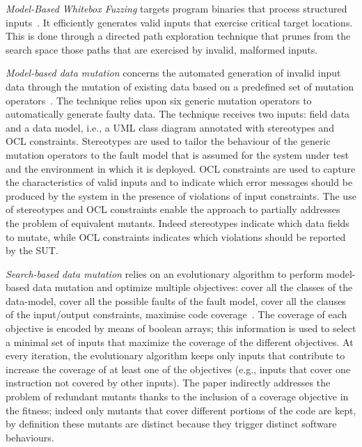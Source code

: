 \emph{Model-Based Whitebox Fuzzing} targets program binaries that process structured inputs~\cite{pham2016model}. It efficiently generates valid inputs that exercise critical target locations. This is done through a directed path exploration technique that prunes from the search space those paths that are exercised by invalid, malformed inputs.

\emph{Model-based data mutation} concerns the automated generation of invalid input data through the mutation of existing data based on a predefined set of mutation operators~\cite{di2015generating}.
The technique relies upon six generic mutation operators to automatically generate faulty data. The technique receives two inputs: field data and a data model, i.e., a UML class diagram annotated with stereotypes and OCL constraints. Stereotypes are used to tailor the behaviour of the generic mutation operators to the fault model that is assumed for the system under test and the environment in which it is deployed. 
OCL constraints are used to capture the characteristics of valid inputs and to indicate which error messages should be produced by the system in the presence of violations of input constraints.
The use of stereotypes and OCL constraints enable the approach to partially addresses the problem of equivalent mutants. Indeed stereotypes indicate which data fields to mutate, while OCL constraints indicates which violations should be reported by the SUT.

\emph{Search-based data mutation} relies on an evolutionary algorithm to perform model-based data mutation and optimize multiple objectives:  
cover all the classes of the data-model, cover all the possible faults of the fault model, cover all the clauses of the input/output constraints,
maximise code coverage~\cite{di2015evolutionary}.
The coverage of each objective is encoded by means of boolean arrays; this information is used to select a minimal set of inputs that maximize the coverage of the different objectives.
At every iteration, the evolutionary algorithm keeps only inputs that contribute to increase the coverage of at least one of the objectives (e.g., inputs that cover one instruction not covered by other inputs).
The paper indirectly addresses the problem of redundant mutants thanks to the inclusion of a coverage objective in the fitness; indeed only mutants that cover different portions of the code are kept, by definition these mutants are distinct because they trigger distinct software behaviours.

